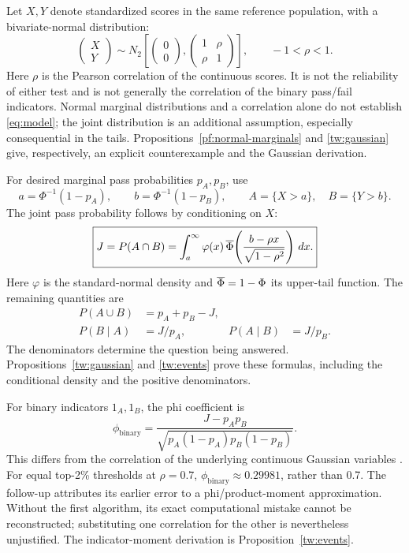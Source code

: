 Let \(X,Y\) denote standardized scores in the same reference population,
with a bivariate-normal distribution:
\begin{equation}
\begin{pmatrix}X\\Y\end{pmatrix}
\sim N_2\!\left[
\begin{pmatrix}0\\0\end{pmatrix},
\begin{pmatrix}1&\rho\\\rho&1\end{pmatrix}\right],
\qquad -1<\rho<1.
\label{eq:model}
\end{equation}
Here \(\rho\) is the Pearson correlation of the continuous scores. It is
not the reliability of either test and is not generally the correlation of
the binary pass/fail indicators. Normal marginal distributions and a
correlation alone do not establish \cref{eq:model}; the joint distribution
is an additional assumption, especially consequential in the tails.
Propositions~\ref{pf:normal-marginals} and \ref{tw:gaussian} give,
respectively, an explicit counterexample and the Gaussian derivation.

For desired marginal pass probabilities \(p_A,p_B\), use
\begin{equation}
a=\Phi^{-1}(1-p_A),\qquad b=\Phi^{-1}(1-p_B),
\qquad A=\{X>a\},\quad B=\{Y>b\}.
\label{eq:cutoffs}
\end{equation}
The joint pass probability follows by conditioning on \(X\):
\begin{equation}
\boxed{J=P(A\cap B)=\int_a^\infty
\varphi(x)\,\overline{\Phi}\!\left(\frac{b-\rho x}{\sqrt{1-\rho^2}}\right)\,dx.}
\label{eq:joint}
\end{equation}
Here \(\varphi\) is the standard-normal density and
\(\overline{\Phi}=1-\Phi\) its upper-tail function. The remaining quantities are
\begin{align}
P(A\cup B)&=p_A+p_B-J,\label{eq:union}\\
P(B\mid A)&=J/p_A, & P(A\mid B)&=J/p_B.\label{eq:conditionals}
\end{align}
The denominators determine the question being answered.
Propositions~\ref{tw:gaussian} and \ref{tw:events} prove these formulas,
including the conditional density and the positive denominators.

For binary indicators \(1_A,1_B\), the phi coefficient is
\begin{equation}
\phi_{\mathrm{binary}}=
\frac{J-p_Ap_B}{\sqrt{p_A(1-p_A)p_B(1-p_B)}}.
\label{eq:phi}
\end{equation}
This differs from the correlation of the underlying continuous Gaussian
variables \citep{ekstrom2011}. For equal top-2\% thresholds at
\(\rho=0.7\), \(\phi_{\mathrm{binary}}\approx0.29981\), rather than 0.7.
The follow-up attributes its earlier error to a phi/product-moment
approximation. Without the first algorithm, its exact computational
mistake cannot be reconstructed; substituting one correlation for the
other is nevertheless unjustified.
The indicator-moment derivation is Proposition~\ref{tw:events}.

